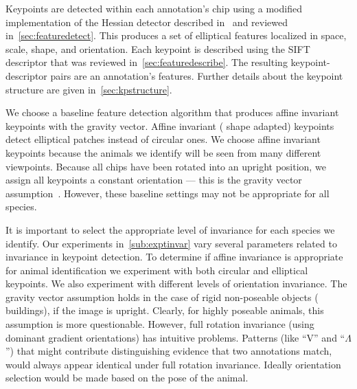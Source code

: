         Keypoints are detected within each annotation's chip using a
          modified implementation of the Hessian detector described
          in~\cite{perdoch_efficient_2009} and reviewed
          in~\cref{sec:featuredetect}.
        This produces a set of elliptical features localized in space,
          scale, shape, and orientation.
        Each keypoint is described using the
          SIFT~\cite{lowe_distinctive_2004} descriptor that was reviewed
          in~\cref{sec:featuredescribe}.
        The resulting keypoint-descriptor pairs are an annotation's
          features.
        Further details about the keypoint structure are given
          in~\cref{sec:kpstructure}.

        We choose a baseline feature detection algorithm that produces
          affine invariant keypoints with the gravity vector.
        Affine invariant (\ie{} shape adapted) keypoints detect
          elliptical patches instead of circular ones.
        We choose affine invariant keypoints because the animals we
          identify will be seen from many different viewpoints.
        Because all chips have been rotated into an upright position,
          we assign all keypoints a constant orientation --- this is the
          gravity vector assumption~\cite{perdoch_efficient_2009}.
        However, these baseline settings may not be appropriate for all
          species.

        It is important to select the appropriate level of invariance
          for each species we identify.
        Our experiments in~\cref{sub:exptinvar} vary several parameters
          related to invariance in keypoint detection.
        To determine if affine invariance is appropriate for animal
          identification we experiment with both circular and elliptical
          keypoints.
        We also experiment with different levels of orientation
          invariance.
        The gravity vector assumption holds in the case of rigid
          non-poseable objects (\eg{} buildings), if the image is
          upright.
        Clearly, for highly poseable animals, this assumption is more
          questionable.
        However, full rotation invariance (using dominant gradient
          orientations) has intuitive problems.
        Patterns (like ``V'' and ``$\Lambda$'') that might contribute
          distinguishing evidence that two annotations match, would
          always appear identical under full rotation invariance.
        Ideally orientation selection would be made based on the pose
          of the animal.

